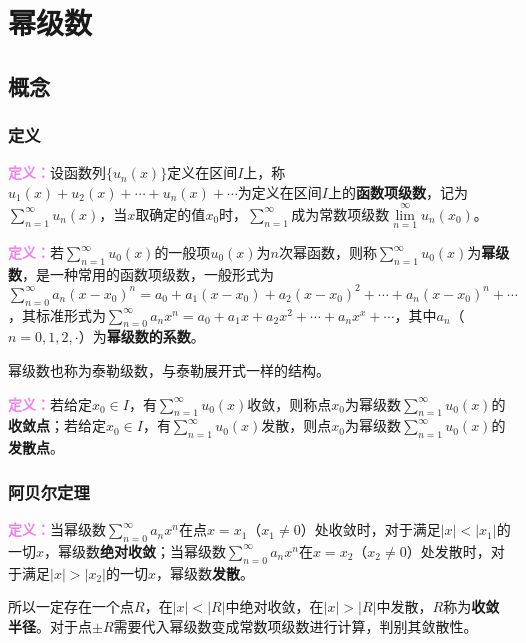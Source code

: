 \section{幂级数}

\subsection{概念}

\subsubsection{定义}

\textcolor{violet}{\textbf{定义：}}设函数列$\{u_n(x)\}$定义在区间$I$上，称$u_1(x)+u_2(x)+\cdots+u_n(x)+\cdots$为定义在区间$I$上的\textbf{函数项级数}，记为$\sum\limits_{n=1}^\infty u_n(x)$，当$x$取确定的值$x_0$时，$\sum\limits_{n=1}^\infty$成为常数项级数$\lim\limits_{n=1}^\infty u_n(x_0)$。

\textcolor{violet}{\textbf{定义：}}若$\sum\limits_{n=1}^\infty u_0(x)$的一般项$u_0(x)$为$n$次幂函数，则称$\sum\limits_{n=1}^\infty u_0(x)$为\textbf{幂级数}，是一种常用的函数项级数，一般形式为$\sum\limits_{n=0}^\infty a_n(x-x_0)^n=a_0+a_1(x-x_0)+a_2(x-x_0)^2+\cdots+a_n(x-x_0)^n+\cdots$，其标准形式为$\sum\limits_{n=0}^\infty a_nx^n=a_0+a_1x+a_2x^2+\cdots+a_nx^x+\cdots$，其中$a_n$（$n=0,1,2,\cdot$）为\textbf{幂级数的系数}。

幂级数也称为泰勒级数，与泰勒展开式一样的结构。

\textcolor{violet}{\textbf{定义：}}若给定$x_0\in I$，有$\sum\limits_{n=1}^\infty u_0(x)$收敛，则称点$x_0$为幂级数$\sum\limits_{n=1}^\infty u_0(x)$的\textbf{收敛点}；若给定$x_0\in I$，有$\sum\limits_{n=1}^\infty u_0(x)$发散，则点$x_0$为幂级数$\sum\limits_{n=1}^\infty u_0(x)$的\textbf{发散点}。

\subsubsection{阿贝尔定理}

\textcolor{violet}{\textbf{定义：}}当幂级数$\sum\limits_{n=0}^\infty a_nx^n$在点$x=x_1$（$x_1\neq0$）处收敛时，对于满足$\vert x\vert<\vert x_1\vert$的一切$x$，幂级数\textbf{绝对收敛}；当幂级数$\sum\limits_{n=0}^\infty a_nx^n$在$x=x_2$（$x_2\neq0$）处发散时，对于满足$\vert x\vert>\vert x_2\vert$的一切$x$，幂级数\textbf{发散}。

所以一定存在一个点$R$，在$\vert x\vert<\vert R\vert$中绝对收敛，在$\vert x\vert>\vert R\vert$中发散，$R$称为\textbf{收敛半径}。对于点$\pm R$需要代入幂级数变成常数项级数进行计算，判别其敛散性。

